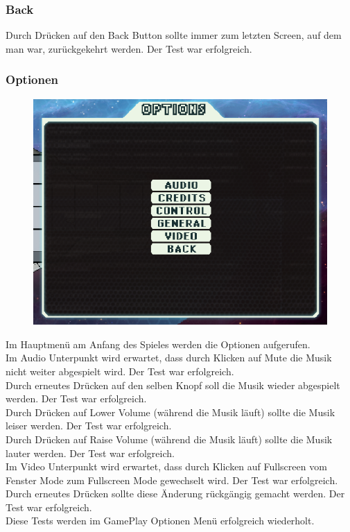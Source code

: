 \documentclass[fontsize=12pt,paper=a4,twoside]{scrartcl}
\begin{document}
\subsubsection{Back}
Durch Drücken auf den Back Button sollte immer zum letzten Screen, auf dem man war, zurückgekehrt werden.  Der Test war erfolgreich. \\
\subsubsection{Optionen}
\begin{figure}[h!]
\centering
\includegraphics[width=0.5\linewidth]{images/options.png}
\end{figure}
Im Hauptmenü am Anfang des Spieles werden die Optionen aufgerufen. \\
Im Audio Unterpunkt wird erwartet, dass durch Klicken auf Mute die Musik nicht weiter abgespielt wird. Der Test war erfolgreich. \\
Durch erneutes Drücken auf den selben Knopf soll die Musik wieder abgespielt werden. Der Test war erfolgreich. \\
Durch Drücken auf Lower Volume (während die Musik läuft) sollte die Musik leiser werden. Der Test war erfolgreich. \\
Durch Drücken auf Raise Volume (während die Musik läuft) sollte die Musik lauter werden. Der Test war erfolgreich. \\
Im Video Unterpunkt wird erwartet, dass durch Klicken auf Fullscreen vom Fenster Mode zum Fullscreen Mode gewechselt wird.  Der Test war erfolgreich. \\
Durch erneutes Drücken sollte diese Änderung rückgängig gemacht werden.  Der Test war erfolgreich. \\
Diese Tests werden im GamePlay Optionen Menü erfolgreich wiederholt. \\



\end{document}
